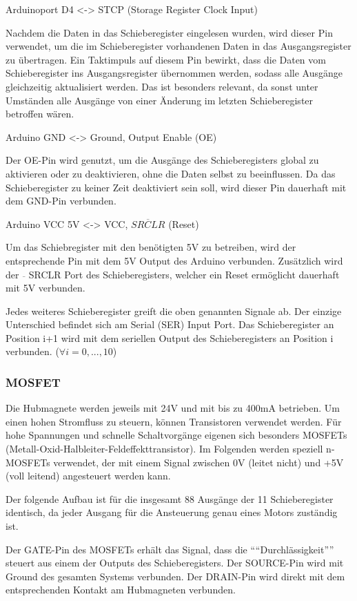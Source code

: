 Arduinoport D4 <-> STCP (Storage Register Clock Input)

Nachdem die Daten in das Schieberegister eingelesen wurden, wird dieser Pin verwendet, um die im Schieberegister vorhandenen Daten in das Ausgangsregister zu übertragen.
Ein Taktimpuls auf diesem Pin bewirkt, dass die Daten vom Schieberegister ins Ausgangsregister übernommen werden, sodass alle Ausgänge gleichzeitig aktualisiert werden.
Das ist besonders relevant, da sonst unter Umständen alle Ausgänge von einer Änderung im letzten Schieberegister betroffen wären.

Arduino GND <-> Ground, Output Enable (OE)

Der OE-Pin wird genutzt, um die Ausgänge des Schieberegisters global zu aktivieren oder zu deaktivieren, ohne die Daten selbst zu beeinflussen.
Da das Schieberegister zu keiner Zeit deaktiviert sein soll, wird dieser Pin dauerhaft mit dem GND-Pin verbunden.

Arduino VCC 5V <-> VCC, $\overline{SRCLR}$ (Reset)

Um das Schiebregister mit den benötigten 5V zu betreiben, wird der entsprechende Pin mit dem 5V Output des Arduino verbunden.
Zusätzlich wird der $\overline{ }$ SRCLR Port des Schieberegisters, welcher ein Reset ermöglicht dauerhaft mit 5V verbunden.

Jedes weiteres Schieberegister greift die oben genannten Signale ab.
Der einzige Unterschied befindet sich am Serial (SER) Input Port.
Das Schieberegister an Position i+1 wird mit dem seriellen Output des Schieberegisters an Position i verbunden. ($\forall i = 0,...,10$)

\subsubsection{MOSFET}

Die Hubmagnete werden jeweils mit 24V und mit bis zu 400mA betrieben.
Um einen hohen Stromfluss zu steuern, können Transistoren verwendet werden.
Für hohe Spannungen und schnelle Schaltvorgänge eigenen sich besonders MOSFETs (Metall-Oxid-Halbleiter-Feldeffekttransistor).
Im Folgenden werden speziell n-MOSFETs verwendet, der mit einem Signal zwischen 0V (leitet nicht) und +5V (voll leitend) angesteuert werden kann.

Der folgende Aufbau ist für die insgesamt 88 Ausgänge der 11 Schieberegister identisch, da jeder Ausgang für die Ansteuerung genau eines Motors zuständig ist.

Der GATE-Pin des MOSFETs erhält das Signal, dass die \enquote{``Durchlässigkeit''} steuert aus einem der Outputs des Schieberegisters.
Der SOURCE-Pin wird mit Ground des gesamten Systems verbunden.
Der DRAIN-Pin wird direkt mit dem entsprechenden Kontakt am Hubmagneten verbunden.

